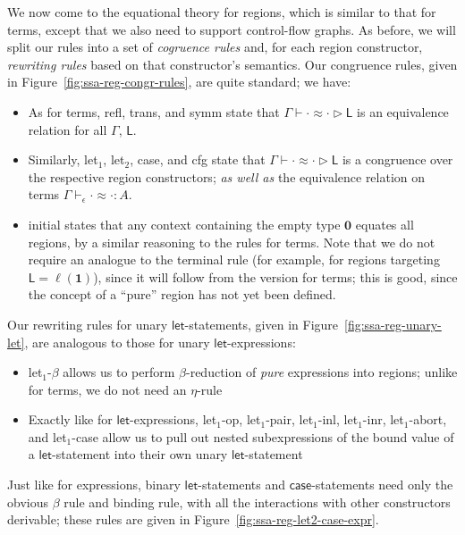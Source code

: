 \documentclass[acmsmall,screen,review]{acmart}
\newcommand{\mb}[1]{\ensuremath{\mathbf{#1}}}
\newcommand{\ms}[1]{\ensuremath{\mathsf{#1}}}
\newcommand{\lhyp}[2]{#1(#2)}
\newcommand{\teqv}{\approx}
\newcommand{\tmeq}[5]{#1 \vdash_{#2} #3 \teqv #4 : {#5}}
\newcommand{\lbeq}[4]{#1 \vdash #2 \teqv #3 \rhd {#4}}
\newcommand{\brle}[1]{{\textsf{#1}}}
\begin{document}
We now come to the equational theory for regions, which is similar to that for terms, except that we
also need to support control-flow graphs. As before, we will split our rules into a set of
\emph{cogruence rules} and, for each region constructor, \emph{rewriting rules} based on that
constructor's semantics. Our congruence rules, given in Figure~\ref{fig:ssa-reg-congr-rules}, are
quite standard; we have:
\begin{itemize}
  \item As for terms, \brle{refl}, \brle{trans}, and \brle{symm} state that
  $\lbeq{\Gamma}{\cdot}{\cdot}{\ms{L}}$ is an equivalence relation for all $\Gamma$, $\ms{L}$.
  \item Similarly, \brle{let$_1$}, \brle{let$_2$}, \brle{case}, and \brle{cfg} state that
  $\lbeq{\Gamma}{\cdot}{\cdot}{\ms{L}}$ is a congruence over the respective region constructors;
  \emph{as well as} the equivalence relation on terms $\tmeq{\Gamma}{\epsilon}{\cdot}{\cdot}{A}$.
  \item \brle{initial} states that any context containing the empty type $\mb{0}$ equates all
  regions, by a similar reasoning to the rules for terms. Note that we do not require an analogue to
  the \brle{terminal} rule (for example, for regions targeting $\ms{L} = \lhyp{\ell}{\mb{1}}$),
  since it will follow from the version for terms; this is good, since the concept of a ``pure''
  region has not yet been defined.
\end{itemize}
Our rewriting rules for unary \ms{let}-statements, given in Figure~\ref{fig:ssa-reg-unary-let}, are
analogous to those for unary \ms{let}-expressions:
\begin{itemize}
  \item \brle{let$_1$-$\beta$} allows us to perform $\beta$-reduction of \emph{pure} expressions
  into regions; unlike for terms, we do not need an $\eta$-rule
  \item Exactly like for \ms{let}-expressions, \brle{let$_1$-op}, \brle{let$_1$-pair},
  \brle{let$_1$-inl}, \brle{let$_1$-inr}, \brle{let$_1$-abort}, and \brle{let$_1$-case} allow us
  to pull out nested subexpressions of the bound value of a \ms{let}-statement into their own
  unary \ms{let}-statement
\end{itemize}
Just like for expressions, binary \ms{let}-statements and \ms{case}-statements need only the obvious
$\beta$ rule and binding rule, with all the interactions with other constructors derivable; these
rules are given in Figure~\ref{fig:ssa-reg-let2-case-expr}.
\end{document}
